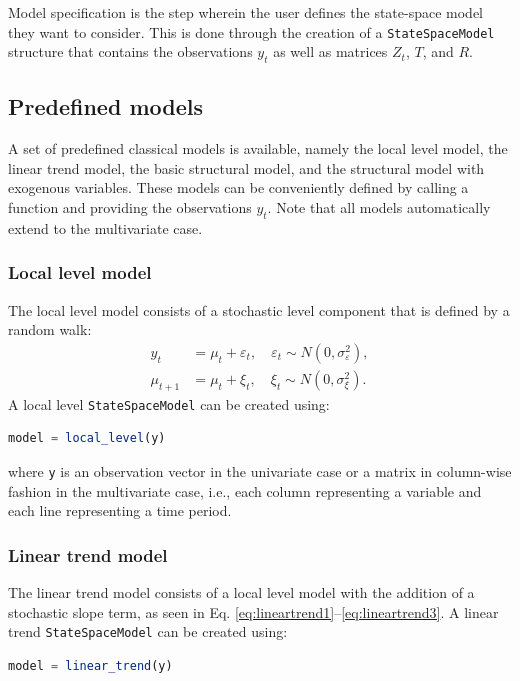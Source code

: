 \documentclass{juliacon}
\begin{document}
Model specification is the step wherein the user defines the state-space model they want to consider. This is done through the creation of a \texttt{StateSpaceModel} structure that contains the observations $y_{t}$ as well as matrices $Z_{t}$, $T$, and $R$.

\subsection{Predefined models} \label{subsec:predefined}

A set of predefined classical models is available, namely the local level model, the linear trend model, the basic structural model, and the structural model with exogenous variables. These models can be conveniently defined by calling a function and providing the observations $y_{t}$. Note that all models automatically extend to the multivariate case.

\subsubsection{Local level model}

The local level model consists of a stochastic level component that is defined by a random walk:
%
\begin{align}
    y_{t} &= \mu_{t} + \varepsilon_{t}, \quad \varepsilon_{t} \sim N(0, \sigma^{2}_\varepsilon), \label{eq:locallevel1} \\
    \mu_{t+1} &= \mu_{t} + \xi_{t}, \quad \xi_{t} \sim N(0, \sigma^{2}_\xi). \label{eq:locallevel2}
\end{align}
%
A local level \texttt{StateSpaceModel} can be created using:
%
\begin{lstlisting}[language = Julia]
model = local_level(y)
\end{lstlisting}
%
\noindent where \texttt{y} is an observation vector in the univariate case or a matrix in column-wise fashion in the multivariate case, i.e., each column representing a variable and each line representing a time period.
%

\subsubsection{Linear trend model}

The linear trend model consists of a local level model with the addition of a stochastic slope term, as seen in Eq. \eqref{eq:lineartrend1}--\eqref{eq:lineartrend3}. A linear trend \texttt{StateSpaceModel} can be created using:
%
\begin{lstlisting}[language = Julia]
model = linear_trend(y)
\end{lstlisting}
\end{document}
